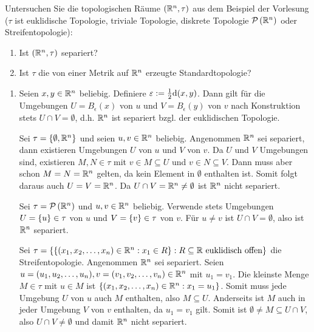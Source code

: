 \begin{exercisePage}
%
%
\begin{exercise}
	Untersuchen Sie die topologischen Räume $(\mathbb{R}^n, \tau)$ aus dem Beispiel der Vorlesung ($\tau$ ist euklidische Topologie, triviale Topologie, diskrete Topologie $\mathcal{P}\left( \mathbb{R}^n \right)$ oder Streifentopologie):
	\begin{enumerate}[leftmargin=*, nolistsep, topsep=-\parskip]
		\item Ist $(\mathbb{R}^n , \tau)$ separiert?
		\item  Ist $\tau$ die von einer Metrik auf $\mathbb{R}^n$ erzeugte Standardtopologie?
	\end{enumerate}
\end{exercise}

\newlength{\zulength}
\settowidth{\zulength}{(zu a)}
\addtolength{\zulength}{1em}

\begin{enumerate}[leftmargin=\zulength, label=(zu \alph*)]
	\item Seien $x,y \in \mathbb{R}^n$ beliebig. Definiere $\varepsilon \mathrel{:=} \frac{1}{2} \mathrm{d} \! \left( x , y \right)$. Dann gilt für die Umgebungen $U = B_\epsilon(x)$ von $u$ und $V = B_\epsilon(y)$ von $v$ nach Konstruktion stets $U \cap V = \emptyset$, d.h. $\mathbb{R}^n$ ist separiert bzgl. der euklidischen Topologie.
	
	Sei $\tau = \left\{ \emptyset, \mathbb{R}^n \right\}$ und seien $u,v \in \mathbb{R}^n$ beliebig. Angenommen $\mathbb{R}^n$ sei separiert, dann existieren Umgebungen $U$ von $u$ und $V$ von $v$. Da $U$ und $V$ Umgebungen sind, existieren $M,N \in \tau$ mit $v \in M \subseteq U$ und $v \in N \subseteq V$. Dann muss aber schon $M = N = \mathbb{R}^n$ gelten, da kein Element in $\emptyset$ enthalten ist. Somit folgt daraus auch $U = V = \mathbb{R}^n$. Da $U \cap V = \mathbb{R}^n \neq \emptyset$ ist $\mathbb{R}^n$ nicht separiert.
	
	Sei $\tau = \mathcal{P}\left( \mathbb{R}^n \right)$ und $u,v \in \mathbb{R}^n$ beliebig. Verwende stets Umgebungen $U = \left\{ u \right\} \in \tau$ von $u$ und $V = \left\{ v \right\} \in \tau$ von $v$. Für $u \neq v$ ist $U \cap V = \emptyset$, also ist $\mathbb{R}^n$ separiert.
	
	Sei $\tau = \left\{  \left\{ (x_1,x_2, \dots, x_n) \in \mathbb{R}^n : x_1 \in R \right\} : R \subseteq \mathbb{R} \text{ euklidisch offen} \right\}$ die Streifentopologie. Angenommen $\mathbb{R}^n$ sei separiert.
	Seien $u = (u_1 , u_2, \dots, u_n), v = (v_1, v_2, \dots, v_n) \in \mathbb{R}^n$ mit $u_1 = v_1$. Die kleinste Menge $M \in \tau$ mit $u \in M$ ist $\left\{ (x_1,x_2, \dots, x_n) \in \mathbb{R}^n : x_1 = u_1 \right\}$. Somit muss jede Umgebung $U$ von $u$ auch $M$ enthalten, also $M \subseteq U$. Anderseits ist $M$ auch in jeder Umgebung $V$ von $v$ enthalten, da $u_1 = v_1$ gilt. Somit ist $\emptyset \neq M \subseteq U \cap V$, also $U \cap V \neq \emptyset$ und damit $\mathbb{R}^n$ nicht separiert.
	

\end{enumerate}
\end{exercisePage}
